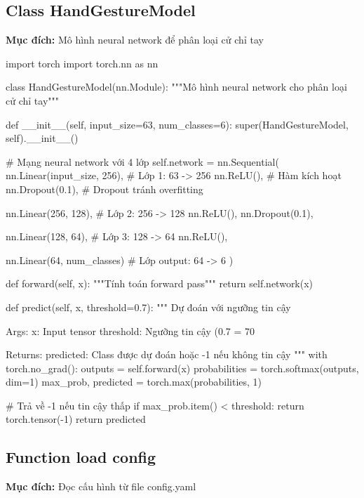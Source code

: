 \subsection{Class HandGestureModel}
\textbf{Mục đích:} Mô hình neural network để phân loại cử chỉ tay

\begin{aivncodebox}
\begin{python}
import torch
import torch.nn as nn

class HandGestureModel(nn.Module):
    """Mô hình neural network cho phân loại cử chỉ tay"""
    
    def __init__(self, input_size=63, num_classes=6):
        super(HandGestureModel, self).__init__()
        
        # Mạng neural network với 4 lớp
        self.network = nn.Sequential(
            nn.Linear(input_size, 256),    # Lớp 1: 63 -> 256
            nn.ReLU(),                     # Hàm kích hoạt
            nn.Dropout(0.1),               # Dropout tránh overfitting
            
            nn.Linear(256, 128),           # Lớp 2: 256 -> 128
            nn.ReLU(),
            nn.Dropout(0.1),
            
            nn.Linear(128, 64),            # Lớp 3: 128 -> 64
            nn.ReLU(),
            
            nn.Linear(64, num_classes)     # Lớp output: 64 -> 6
        )
    
    def forward(self, x):
        """Tính toán forward pass"""
        return self.network(x)
    
    def predict(self, x, threshold=0.7):
        """
        Dự đoán với ngưỡng tin cậy
        
        Args:
            x: Input tensor
            threshold: Ngưỡng tin cậy (0.7 = 70%
            
        Returns:
            predicted: Class được dự đoán hoặc -1 nếu không tin cậy
        """
        with torch.no_grad():
            outputs = self.forward(x)
            probabilities = torch.softmax(outputs, dim=1)
            max_prob, predicted = torch.max(probabilities, 1)
            
            # Trả về -1 nếu tin cậy thấp
            if max_prob.item() < threshold:
                return torch.tensor(-1)
            return predicted
\end{python}
\end{aivncodebox}

\subsection{Function load config}
\textbf{Mục đích:} Đọc cấu hình từ file config.yaml

